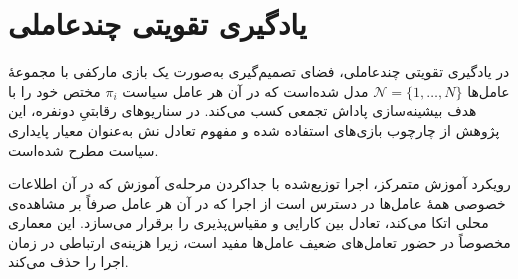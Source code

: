     
    \section{یادگیری تقویتی چندعاملی}\label{sec:marl}

    در یادگیری تقویتی چندعاملی،
     فضای تصمیم‌گیری به‌صورت یک بازی مارکفی
      با مجموعهٔ عامل‌ها
      {$\mathcal{N}=\{1,\dots,N\}$} 
      مدل شده‌است که در آن هر عامل سیاست {$\pi_i$} مختص خود را با هدف بیشینه‌سازی پاداش تجمعی کسب می‌کند. در سناریوهای رقابتیِ دونفره، این پژوهش از چارچوب بازی‌های   استفاده شده و مفهوم تعادل نش
       به‌عنوان معیار پایداری سیاست مطرح شده‌است.


    رویکرد آموزش متمرکز، اجرا توزیع‌شده
     با جداکردن مرحله‌ی آموزش که در آن اطلاعات خصوصی همهٔ عامل‌ها در دسترس است از اجرا که در آن هر عامل صرفاً بر مشاهده‌ی محلی اتکا می‌کند، تعادل بین کارایی و مقیاس‌پذیری را برقرار می‌سازد. این معماری مخصوصاً در حضور تعامل‌های ضعیف عامل‌ها مفید است، زیرا هزینه‌ی ارتباطی در زمان اجرا را حذف می‌کند.
    
%
%

